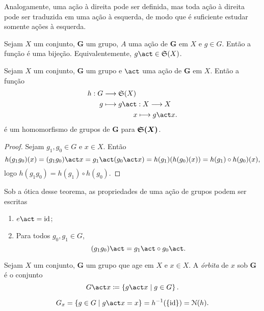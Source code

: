 Analogamente, uma ação à direita pode ser definida, mas toda ação à direita pode ser traduzida em uma ação à esquerda, de modo que é suficiente estudar somente ações à esquerda.

\begin{prop}
Sejam $X$ um conjunto, $\bm G$ um grupo, $A$ uma ação de $\bm G$ em $X$ e $g \in G$. Então a função
é uma bijeção. Equivalentemente, $g\act \in \simm{X}$.
\end{prop}

\begin{prop}
Sejam $X$ um conjunto, $\bm G$ um grupo e $\act$ uma ação de $\bm G$ em $X$. Então a função
	\begin{align*}
	h: G &\to \simm{X} \\
			g &\mapsto g\act: X \to X\\
				&\qquad\qquad\; x \mapsto g\act x.
	\end{align*}
é um homomorfismo de grupos de $\bm G$ para $\bm{\mathfrak{S}(X)}$.
\end{prop}
\begin{proof}
Sejam $g_1,g_0 \in G$ e $x \in X$. Então
	\begin{equation*}
	h(g_1g_0)(x) =(g_1g_0) \act x = g_1 \act (g_0 \act x) = h(g_1)(h(g_0)(x)) = h(g_1) \circ h(g_0)(x),
	\end{equation*}
logo $h(g_1g_0)=h(g_1) \circ h(g_0)$.
\end{proof}

Sob a ótica desse teorema, as propriedades de uma ação de grupos podem ser escritas
	\begin{enumerate}
	\item $e\act = \id$;
	\item Para todos $g_0,g_1 \in G$,
		\begin{equation*}
		(g_1g_0)\act = g_1\act \circ g_0\act.
		\end{equation*}
	\end{enumerate}

\begin{defi}
Sejam $X$ um conjunto, $\bm G$ um grupo que age em $X$ e $x \in X$. A \emph{órbita} de $x$ sob $\bm G$ é o conjunto
	\begin{equation*}
	G \act x \coloneqq \set{g\act x}{g \in G}.
	\end{equation*}
\end{defi}



\begin{equation*}
G_x = \set{g \in G}{g\act x = x} = h\inv(\{\id\}) = \nuc(h).
\end{equation*}




















